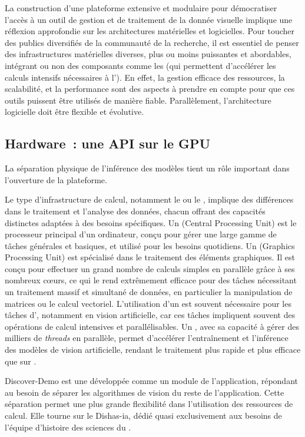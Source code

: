La construction d'une plateforme extensive et modulaire pour
démocratiser l'accès à un outil de gestion et de traitement de la donnée
visuelle implique une réflexion approfondie sur les architectures
matérielles et logicielles. Pour toucher des publics diversifiés de la communauté de la recherche, il est
essentiel de penser des infrastructures matérielles diverses, plus ou
moins puissantes et abordables, intégrant ou non des composants comme
les \gpu (qui permettent d'accélérer les calculs intensifs nécessaires à
l'\ia). En effet, la gestion efficace des ressources, la scalabilité,
et la performance sont des aspects à prendre en compte pour
que ces outils puissent être utilisés de manière fiable. Parallèlement, l'architecture logicielle doit être flexible et
évolutive. 

\hypertarget{hardware-une-api-sur-le-gpu}{%
\subsection{Hardware~: une API sur le GPU}\label{hardware-une-api-sur-le-gpu}}

La séparation physique de l'inférence des modèles tient un rôle
important dans l'ouverture de la plateforme.

Le type d'infrastructure de calcul, notamment le \cpu ou le \gpu,
implique des différences dans le traitement et l'analyse des données,
chacun offrant des capacités distinctes adaptées à des besoins
spécifiques. Un \cpu (Central Processing Unit) est le processeur
principal d'un ordinateur, conçu pour gérer une large gamme de tâches
générales et basiques, et utilisé pour les besoins quotidiens. Un \gpu
(Graphics Processing Unit) est spécialisé dans le
traitement des éléments graphiques. Il est conçu pour effectuer un grand
nombre de calculs simples en parallèle grâce à ses nombreux cœurs, ce
qui le rend extrêmement efficace pour des tâches nécessitant un
traitement massif et simultané de données, en particulier la manipulation de matrices ou le calcul vectoriel. L'utilisation d'un \gpu est
souvent nécessaire pour les tâches d'\ia, notamment en vision
artificielle, car ces tâches impliquent souvent des opérations de calcul
intensives et parallélisables. Un \gpu, avec sa capacité à gérer des
milliers de \textit{threads} en parallèle, permet d'accélérer l'entraînement
et l'inférence des modèles de vision artificielle, rendant le traitement
plus rapide et plus efficace que sur \cpu.

Discover-Demo est une \api développée comme un module de l'application, répondant au besoin de séparer les algorithmes de vision du reste
de l'application. Cette séparation permet une plus grande flexibilité
dans l'utilisation des ressources de calcul. Elle tourne sur le \gpu
Dishas-ia, dédié quasi exclusivement aux besoins de l'équipe d'histoire
des sciences du \syrte.

